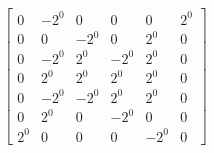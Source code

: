 \documentclass{article}%
\begin{document}
\[\left[\begin{matrix}0 & - 2^{0} & 0 & 0 & 0 & 2^{0}\\0 & 0 & - 2^{0} & 0 & 2^{0} & 0\\0 & - 2^{0} & 2^{0} & - 2^{0} & 2^{0} & 0\\0 & 2^{0} & 2^{0} & 2^{0} & 2^{0} & 0\\0 & - 2^{0} & - 2^{0} & 2^{0} & 2^{0} & 0\\0 & 2^{0} & 0 & - 2^{0} & 0 & 0\\2^{0} & 0 & 0 & 0 & - 2^{0} & 0\end{matrix}\right]%
\]%
\end{document}
